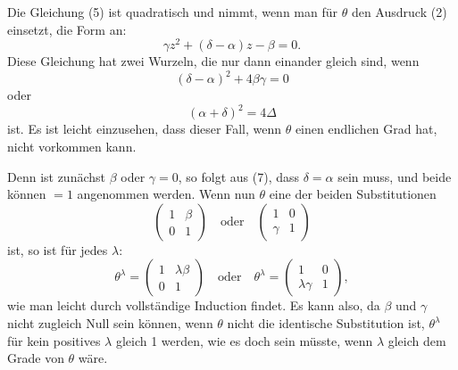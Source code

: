 \documentclass[12pt,a4paper]{article}
\theoremstyle{plain}
\theoremstyle{definition}
\theoremstyle{remark}
\begin{document}
Die Gleichung (5) ist quadratisch und nimmt, wenn man
f\"ur $\theta$ den Ausdruck (2) einsetzt, die Form an:
\begin{equation}\label{eq:51_6}
\gamma z^2 + (\delta - \alpha)z - \beta = 0.\tag{6}
\end{equation}
Diese Gleichung hat zwei Wurzeln, die nur dann einander
gleich sind, wenn
\begin{equation}\label{eq:51_7}
(\delta - \alpha)^2 + 4\beta\gamma = 0\tag{7}
\end{equation}
oder
\begin{equation}\label{eq:51_8}
(\alpha + \delta)^2 = 4\Delta\tag{8}
\end{equation}
ist. Es ist leicht einzusehen, dass dieser Fall, wenn $\theta$ einen
endlichen Grad hat, nicht vorkommen kann.

Denn ist zun\"achst $\beta$ oder $\gamma = 0$, so folgt aus (7), dass
$\delta = \alpha$ sein muss, und beide k\"onnen $= 1$ angenommen werden.
Wenn nun $\theta$ eine der beiden Substitutionen
\[
\begin{pmatrix}1 & \beta\\ 0 & 1\end{pmatrix}\quad\text{oder}\quad
\begin{pmatrix}1 & 0\\ \gamma & 1\end{pmatrix}
\]
ist, so ist f\"ur jedes $\lambda$:
\[
\theta^\lambda = \begin{pmatrix}1 & \lambda\beta\\ 0 & 1\end{pmatrix}\quad\text{oder}\quad
\theta^\lambda = \begin{pmatrix}1 & 0\\ \lambda\gamma & 1\end{pmatrix},
\]
wie man leicht durch vollst\"andige Induction findet. Es kann
also, da $\beta$ und $\gamma$ nicht zugleich Null sein k\"onnen, wenn $\theta$ nicht
die identische Substitution ist, $\theta^\lambda$ f\"ur kein positives $\lambda$ gleich 1
werden, wie es doch sein m\"usste, wenn $\lambda$ gleich dem Grade von
$\theta$ w\"are.
\end{document}
